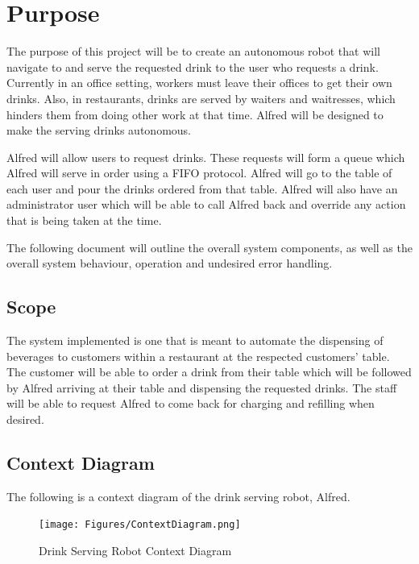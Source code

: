 \documentclass [10pt]{article}
\begin{document}


\section {Purpose}

The purpose of this project will be to create an autonomous robot that will navigate to and serve
the requested drink to the user who requests a drink. Currently in an office setting, workers must
leave their offices to get their own drinks. Also, in restaurants, drinks are served by waiters and
waitresses, which hinders them from doing other work at that time. Alfred will be designed to make the serving drinks autonomous.\newline

Alfred will allow users to request drinks. These requests will form a queue which Alfred will serve in order using a FIFO protocol. Alfred will go to the table of each user and pour the drinks ordered from that table. Alfred will also have an administrator user which will be able to call Alfred back and override any action that is being taken at the time.\newline

The following document will outline the overall system components, as well as the overall system behaviour, operation and undesired error handling.

\subsection{Scope}

The system implemented is one that is meant to automate the dispensing of beverages to customers within a restaurant at the respected customers' table. The customer will be able to order a drink from their table which will be followed by Alfred arriving at their table and dispensing the requested drinks. The staff will be able to request Alfred to come back for charging and refilling when desired.


\subsection{Context Diagram}
The following is a context diagram of the drink serving robot, Alfred.
\begin{figure} [h!]
	\centering
	\texttt{[image: Figures/ContextDiagram.png]}
	\caption{Drink Serving Robot Context Diagram}
\end{figure}
\end{document}
